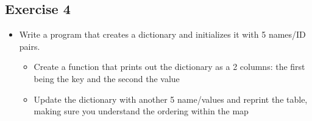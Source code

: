 \documentclass[letterpaper,10pt,english,openany]{sphinxmanual}
\begin{document}
\subsection{Exercise 4}
\label{\detokenize{introduction_to_python/solutions_to_exercises:exercise-4}}\begin{itemize}
\item {} 
Write a program that creates a dictionary and initializes it with 5
names/ID pairs.
\begin{itemize}
\item {} 
Create a function that prints out the dictionary as a 2 columns:
the first being the key and the second the value

\item {} 
Update the dictionary with another 5 name/values and reprint the
table, making sure you understand the ordering within the map

\end{itemize}

\end{itemize}
\end{document}
